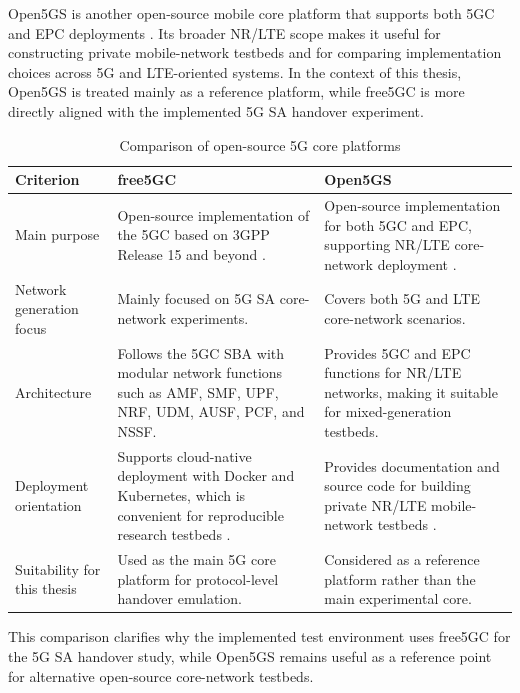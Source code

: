 Open5GS is another open-source mobile core platform that supports both 5GC and EPC deployments \cite{open5gs_project}. Its broader NR/LTE scope makes it useful for constructing private mobile-network testbeds and for comparing implementation choices across 5G and LTE-oriented systems. In the context of this thesis, Open5GS is treated mainly as a reference platform, while free5GC is more directly aligned with the implemented 5G SA handover experiment.

\begin{table}[H]
\centering
\caption{Comparison of open-source 5G core platforms}
\label{tab:free5gc-open5gs-comparison}
\renewcommand{\tabularxcolumn}[1]{>{\raggedright\arraybackslash}p{#1}}
\begin{tabularx}{\textwidth}{|>{\raggedright\arraybackslash}p{3.2cm}|>{\raggedright\arraybackslash}X|>{\raggedright\arraybackslash}X|}
\hline
\textbf{Criterion} & \textbf{free5GC} & \textbf{Open5GS} \\
\hline
Main purpose & Open-source implementation of the 5GC based on 3GPP Release 15 and beyond \cite{free5gc_project}. & Open-source implementation for both 5GC and EPC, supporting NR/LTE core-network deployment \cite{open5gs_project}. \\
\hline
Network generation focus & Mainly focused on 5G SA core-network experiments. & Covers both 5G and LTE core-network scenarios. \\
\hline
Architecture & Follows the 5GC SBA with modular network functions such as AMF, SMF, UPF, NRF, UDM, AUSF, PCF, and NSSF. & Provides 5GC and EPC functions for NR/LTE networks, making it suitable for mixed-generation testbeds. \\
\hline
Deployment orientation & Supports cloud-native deployment with Docker and Kubernetes, which is convenient for reproducible research testbeds \cite{free5gc_project}. & Provides documentation and source code for building private NR/LTE mobile-network testbeds \cite{open5gs_project}. \\
\hline
Suitability for this thesis & Used as the main 5G core platform for protocol-level handover emulation. & Considered as a reference platform rather than the main experimental core. \\
\hline
\end{tabularx}
\renewcommand{\tabularxcolumn}[1]{>{\raggedright\arraybackslash}p{#1}}
\end{table}

This comparison clarifies why the implemented test environment uses free5GC for the 5G SA handover study, while Open5GS remains useful as a reference point for alternative open-source core-network testbeds.

